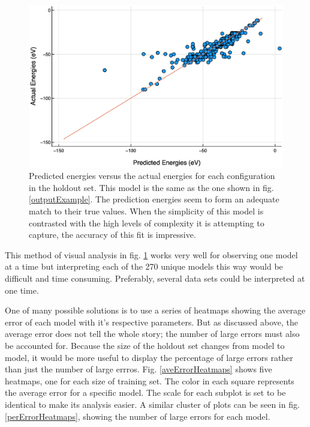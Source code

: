 \begin{figure}%
\centering
\includegraphics[scale = 0.5]{Figures/accuracyPlot}
\caption{Predicted energies versus the actual energies for each configuration in the holdout set. This model is the same as the one shown in fig. \ref{outputExample}. The prediction energies seem to form an adequate match to their true values. When the simplicity of this model is contrasted with the high levels of complexity it is attempting to capture, the accuracy of this fit is impressive.
\label{accuracyPlot}} 
\end{figure}

\par This method of visual analysis in fig. \ref{accuracyPlot} works very well for observing one model at a time but interpreting each of the 270 unique models this way would be difficult and time consuming. Preferably, several data sets could be interpreted at one time.
\par One of many possible solutions is to use a series of heatmaps showing the average error of each model with it's respective parameters. But as discussed above, the average error does not tell the whole story; the number of large errors must also be accounted for. Because the size of the holdout set changes from model to model, it would be more useful to display the percentage of large errors rather than just the number of large errros. Fig. \ref{aveErrorHeatmaps} shows five heatmaps, one for each size of training set. The color in each square represents the average error for a specific model. The scale for each subplot is set to be identical to make its analysis easier. A similar cluster of plots can be seen in fig. \ref{perErrorHeatmaps}, showing the number of large errors for each model. 

